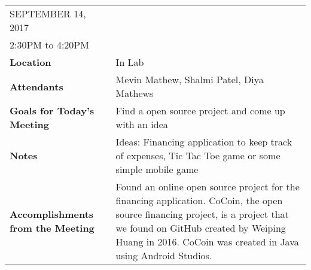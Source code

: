 \documentclass{article}
\begin{document}
\begin{table}[hp]
\begin{tabularx}{\textwidth}{lX}
\toprule
SEPTEMBER 14, 2017\\
2:30PM to 4:20PM\\
\midrule
\textbf{Location} & In Lab\\
\textbf{Attendants} & Mevin Mathew, Shalmi Patel, Diya Mathews\\
\midrule
\textbf{Goals for Today's Meeting} & Find a open source project and come up with an idea\\
\midrule
\textbf{Notes} & Ideas: Financing application to keep track of expenses, Tic Tac Toe game or some simple mobile game\\
\midrule
\textbf{Accomplishments from the Meeting} & Found an online open source project for the financing application. CoCoin, the open source financing project, is a project that we found on GitHub created by Weiping Huang in 2016. CoCoin was created in Java  using Android Studios.\\
\bottomrule
\end{tabularx}
\end{table}
\end{document}
